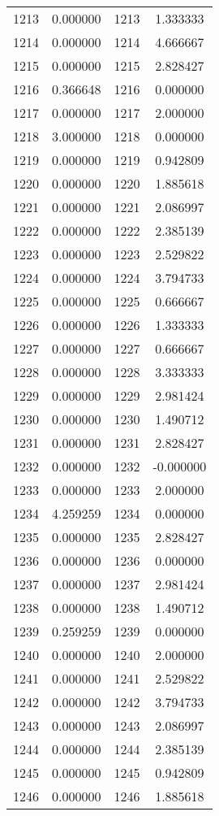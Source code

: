 \documentclass[12pt]{article}
\begin{document}
\begin{longtable}{@{}cccc@{}}
1213 & 0.000000 & 1213 & 1.333333 \\
1214 & 0.000000 & 1214 & 4.666667 \\
1215 & 0.000000 & 1215 & 2.828427 \\
1216 & 0.366648 & 1216 & 0.000000 \\
1217 & 0.000000 & 1217 & 2.000000 \\
1218 & 3.000000 & 1218 & 0.000000 \\
1219 & 0.000000 & 1219 & 0.942809 \\
1220 & 0.000000 & 1220 & 1.885618 \\
1221 & 0.000000 & 1221 & 2.086997 \\
1222 & 0.000000 & 1222 & 2.385139 \\
1223 & 0.000000 & 1223 & 2.529822 \\
1224 & 0.000000 & 1224 & 3.794733 \\
1225 & 0.000000 & 1225 & 0.666667 \\
1226 & 0.000000 & 1226 & 1.333333 \\
1227 & 0.000000 & 1227 & 0.666667 \\
1228 & 0.000000 & 1228 & 3.333333 \\
1229 & 0.000000 & 1229 & 2.981424 \\
1230 & 0.000000 & 1230 & 1.490712 \\
1231 & 0.000000 & 1231 & 2.828427 \\
1232 & 0.000000 & 1232 & -0.000000 \\
1233 & 0.000000 & 1233 & 2.000000 \\
1234 & 4.259259 & 1234 & 0.000000 \\
1235 & 0.000000 & 1235 & 2.828427 \\
1236 & 0.000000 & 1236 & 0.000000 \\
1237 & 0.000000 & 1237 & 2.981424 \\
1238 & 0.000000 & 1238 & 1.490712 \\
1239 & 0.259259 & 1239 & 0.000000 \\
1240 & 0.000000 & 1240 & 2.000000 \\
1241 & 0.000000 & 1241 & 2.529822 \\
1242 & 0.000000 & 1242 & 3.794733 \\
1243 & 0.000000 & 1243 & 2.086997 \\
1244 & 0.000000 & 1244 & 2.385139 \\
1245 & 0.000000 & 1245 & 0.942809 \\
1246 & 0.000000 & 1246 & 1.885618 \\

\end{longtable}
\end{document}
